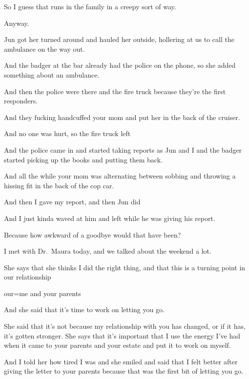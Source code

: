 {
So I guess that runs in the family
in a creepy sort of way.

Anyway.

Jun got her turned around and
hauled her outside, hollering at us to call the ambulance on the way
out.

And the badger at the bar already
had the police on the phone, so she added something about an ambulance.

And then the police were there and
the fire truck because they're the first responders.

And they fucking handcuffed your
mom and put her in the back of the cruiser.

And no one was hurt, so the fire
truck left

And the police came in and started
taking reports as Jun and I and the badger started picking up the books
and putting them back.

And all the while your mom was
alternating between sobbing and throwing a hissing fit in the back of
the cop car.

And then I gave my report, and then
Jun did

And I just kinda waved at him and
left while he was giving his report.

Because how awkward of a goodbye
would that have been?

I met with Dr.~Maura today, and we
talked about the weekend a lot.

She says that she thinks I did the
right thing, and that this is a turning point in our relationship

our=me and your parents

And she said that it's time to work
on letting you go.

She said that it's not because my
relationship with you has changed, or if it has, it's gotten stronger.
She says that it's important that I use the energy I've had when it came
to your parents and your estate and put it to work on myself.

And I told her how tired I was and
she smiled and said that I felt better after giving the letter to your
parents because that was the first bit of letting you go.

}
